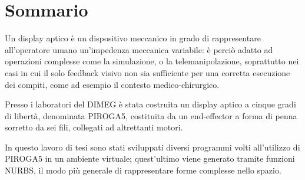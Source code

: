 
\chapter*{Sommario}
\thispagestyle{empty}


Un display aptico è un dispositivo meccanico in grado di rappresentare all'operatore umano un'impedenza meccanica variabile: è perciò adatto ad operazioni complesse come la simulazione, o la telemanipolazione, soprattutto nei casi in cui il solo feedback visivo non sia sufficiente per una corretta esecuzione dei compiti, come ad esempio il contesto medico-chirurgico.

Presso i laboratori del DIMEG è stata costruita un display
aptico a cinque gradi di libertà, denominata PIROGA5, costituita da un end-effector
a forma di penna sorretto da sei fili, collegati ad altrettanti motori.

In questo lavoro di tesi sono stati sviluppati diversi programmi
volti all'utilizzo di PIROGA5 in un ambiente virtuale; quest'ultimo viene generato tramite
funzioni NURBS, il modo più generale di rappresentare forme complesse nello spazio.



\clearpage
\thispagestyle{empty}
\cleardoublepage
